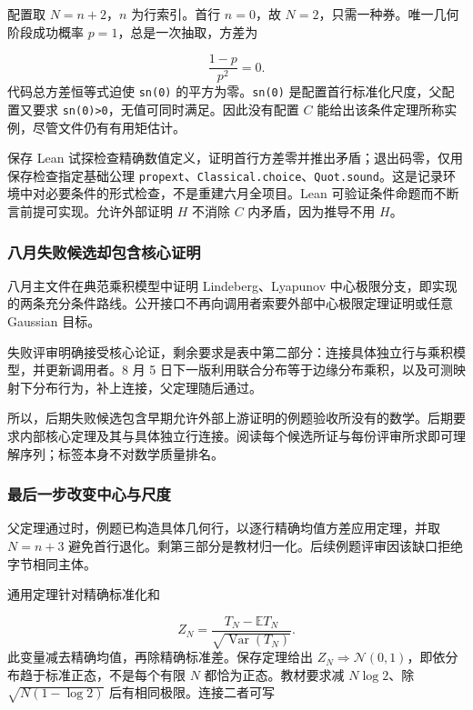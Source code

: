 配置取 $N=n+2$，$n$ 为行索引。首行 $n=0$，故 $N=2$，只需一种券。唯一几何阶段成功概率 $p=1$，总是一次抽取，方差为

\[
\frac{1-p}{p^2}=0.
\]
代码总方差恒等式迫使 \nolinkurl{sn(0)} 的平方为零。\nolinkurl{sn(0)} 是配置首行标准化尺度，父配置又要求 \nolinkurl{sn(0)>0}，无值可同时满足。因此没有配置 $C$ 能给出该条件定理所称实例，尽管文件仍有有用矩估计。

保存 Lean 试探检查精确数值定义，证明首行方差零并推出矛盾；退出码零，仅用保存检查指定基础公理 \nolinkurl{propext}、\nolinkurl{Classical.choice}、\nolinkurl{Quot.sound}。这是记录环境中对必要条件的形式检查，不是重建六月全项目。Lean 可验证条件命题而不断言前提可实现。允许外部证明 $H$ 不消除 $C$ 内矛盾，因为推导不用 $H$。

\subsubsection[八月失败候选却包含核心证明]{\texorpdfstring{\protect\hypertarget{l3-4}{}八月失败候选却包含核心证明}{八月失败候选却包含核心证明}}
八月主文件在典范乘积模型中证明 Lindeberg、Lyapunov 中心极限分支，即实现的两条充分条件路线。公开接口不再向调用者索要外部中心极限定理证明或任意 Gaussian 目标。

失败评审明确接受核心论证，剩余要求是表中第二部分：连接具体独立行与乘积模型，并更新调用者。8 月 5 日下一版利用联合分布等于边缘分布乘积，以及可测映射下分布行为，补上连接，父定理随后通过。

所以，后期失败候选包含早期允许外部上游证明的例题验收所没有的数学。后期要求内部核心定理及其与具体独立行连接。阅读每个候选所证与每份评审所求即可理解序列；标签本身不对数学质量排名。

\subsubsection[最后一步改变中心与尺度]{\texorpdfstring{\protect\hypertarget{l3-5}{}最后一步改变中心与尺度}{最后一步改变中心与尺度}}
父定理通过时，例题已构造具体几何行，以逐行精确均值方差应用定理，并取 $N=n+3$ 避免首行退化。剩第三部分是教材归一化。后续例题评审因该缺口拒绝字节相同主体。

通用定理针对精确标准化和

\[
Z_N=\frac{T_N-\mathbb E T_N}{\sqrt{\operatorname{Var}(T_N)}}.
\]
此变量减去精确均值，再除精确标准差。保存定理给出 $Z_N\Rightarrow\mathcal N(0,1)$，即依分布趋于标准正态，不是每个有限 $N$ 都恰为正态。教材要求减 $N\log2$、除 $\sqrt{N(1-\log2)}$ 后有相同极限。连接二者可写


